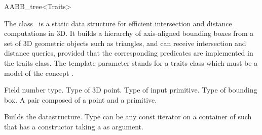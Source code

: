 \ccRefPageBegin


\begin{ccRefClass}{AABB_tree<Traits>}  %


\ccDefinition
  
The class \ccRefName\ is a static data structure for efficient intersection and distance computations in 3D. It builds a hierarchy of axis-aligned bounding boxes from a set of 3D geometric objects such as triangles, and can receive intersection and distance queries, provided that the corresponding predicates are implemented in the traits class. The template parameter  stands for a traits class which must be a model of the concept .


\ccTypes

          {Field number type.}
\ccGlue
{}
          {Type of 3D point.}
\ccGlue
{}
          {Type of input primitive.}
\ccGlue
{}
          {Type of bounding box.}
\ccGlue
{}
             {A pair composed of a point and a primitive.}


\ccCreation
{} %

{Builds the datastructure. Type  can be any const iterator on a container of  such that  has a constructor taking a  as argument.}


\end{ccRefClass}
